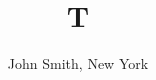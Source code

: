 \documentclass{amsart}
\begin{document}
\title{T}
\author{John Smith, New York}
\maketitle
\end{document}
